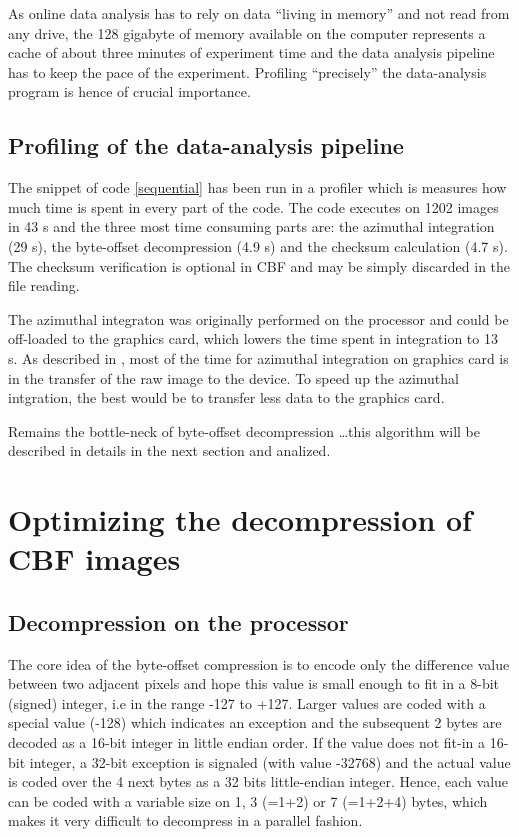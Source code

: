 \documentclass[preprint, pdf]{iucr}              %
\begin{document}
As online data analysis has to rely on data ``living in memory'' and not
read from any drive, the 128 gigabyte of memory available on the computer
represents a cache of about three minutes of experiment time and the data
analysis pipeline has to keep the pace of the experiment. 
Profiling ``precisely'' the data-analysis program is hence of crucial
importance.

\subsection{Profiling of the data-analysis pipeline}

The snippet of code \ref{sequential} has been run in a profiler which is
measures how much time is spent in every part of the code. 
The code executes on 1202 images in 43 s and the three most time consuming parts
are: the azimuthal integration (29 s), the byte-offset decompression (4.9 s) and
the checksum calculation (4.7 s).
The checksum verification is optional in CBF and may be simply discarded in the
file reading.

The azimuthal integraton was originally performed on the processor and could be
off-loaded to the graphics card, which lowers the time spent in integration to 
13 s.
As described in \cite{kieffer_ashiotis-proc-euroscipy-2014}, most of the time
for azimuthal integration on graphics card is in the transfer of the raw image
to the device.
To speed up the azimuthal intgration, the best would be to transfer less data to
the graphics card.

Remains the bottle-neck of byte-offset decompression \ldots this algorithm will
be described in details in the next section and analized. 

\section{Optimizing the decompression of CBF images}

\subsection{Decompression on the processor}

The core idea of the byte-offset compression is to encode only the difference
value between two adjacent pixels and hope this value is small enough to fit in
a 8-bit (signed) integer, i.e in the range -127 to +127.
Larger values are coded with a special value (-128) which indicates an exception
and the subsequent 2 bytes are decoded as a 16-bit integer in little endian
order.
If the value does not fit-in a 16-bit integer, a 32-bit exception is
signaled (with value -32768) and the actual value is coded over the 4 next bytes
as a 32 bits little-endian integer.
Hence, each value can be coded with a variable size on 1, 3 (=1+2) or 7 (=1+2+4)
bytes, which makes it very difficult to decompress in a parallel fashion.
\end{document}

